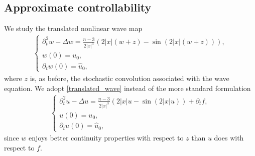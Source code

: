 \documentclass[12pt,reqno]{amsart}
\theoremstyle{plain}
\theoremstyle{remark}
\theoremstyle{plain}
\theoremstyle{definition}
\numberwithin{equation}{section}
\numberwithin{equation}{section}
\begin{document}
	\subsection{Approximate controllability}\label{approx_control}
	We study the translated nonlinear wave map
\begin{align}\label{translated_wave}
		\begin{cases}
			\partial_t^2 w-\Delta w=\frac{n-3}{2\lvert x\rvert^3}(2\lvert x\rvert (w+z)-\sin (2\lvert x\rvert (w+z))),\\
			w(0)= u_0,\\
			\partial_t w(0)=\hat{u}_0,    
		\end{cases}
	\end{align}
	where $z$ is, as before, the stochastic convolution associated with the wave equation. We adopt \eqref{translated_wave} instead of the more standard formulation
	\begin{align}\label{aux_wave_map}
		\begin{cases}
			\partial_t^2 u-\Delta u=\frac{n-3}{2\lvert x\rvert^3}(2\lvert x\rvert u-\sin (2\lvert x\rvert u))+\partial_t f,\\
			u(0)= u_0,\\
			\partial_t u(0)=\hat{u}_0,   
		\end{cases}
	\end{align}
	since $w$ enjoys better continuity properties with respect to $z$ than $u$ does with respect to $f$.
    
\end{document}
